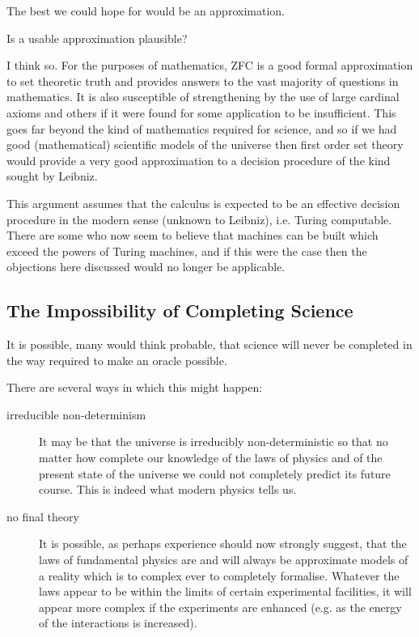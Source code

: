 \documentclass{rbjk}
\begin{document}
\begin{article}
The best we could hope for would be an approximation.

Is a usable approximation plausible?

I think so.
For the purposes of mathematics, ZFC is a good formal approximation to set theoretic truth and provides answers to the vast majority of questions in mathematics.
It is also susceptible of strengthening by the use of large cardinal axioms and others if it were found for some application to be insufficient.
This goes far beyond the kind of mathematics required for science, and so if we had good (mathematical) scientific models of the universe then first order set theory would provide a very good approximation to a decision procedure of the kind sought by Leibniz.

This argument assumes that the calculus is expected to be an effective decision procedure in the modern sense (unknown to Leibniz), i.e. Turing computable.
There are some who now seem to believe that machines can be built which exceed the powers of Turing machines, and if this were the case then the objections here discussed would no longer be applicable.

\subsection{The Impossibility of Completing Science}

It is possible, many would think probable, that science will never be completed in the way required to make an oracle possible.

There are several ways in which this might happen:

\begin{description}
\item [irreducible non-determinism]

It may be that the universe is irreducibly non-deterministic so that no matter how complete our knowledge of the laws of physics and of the present state of the universe we could not completely predict its future course.
This is indeed what modern physics tells us.

\item[no final theory]

It is possible, as perhaps experience should now strongly suggest, that the laws of fundamental physics are and will always be approximate models of a reality which is to complex ever to completely formalise.
Whatever the laws appear to be within the limits of certain experimental facilities, it will appear more complex if the experiments are enhanced (e.g. as the energy of the interactions is increased).


\end{description}
\end{article}
\end{document}
